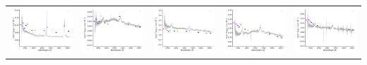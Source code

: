\begin{center}
\begin{longtable}{l l l l l }
    \includegraphics[width=0.2\linewidth, clip]{Figs/Figs-sdss/spec-9238-58013-0137-SPLUS-s02s09-056401.pdf} & \includegraphics[width=0.2\linewidth, clip]{Figs/Figs-sdss/spec-9239-58018-0729-STRIPE82-0136-042690.pdf} & \includegraphics[width=0.2\linewidth, clip]{Figs/Figs-sdss/spec-9383-58097-0530-STRIPE82-0047-031879.pdf} & \includegraphics[width=0.2\linewidth, clip]{Figs/Figs-sdss/spec-9403-58018-0690-STRIPE82-0002-034805.pdf} & \includegraphics[width=0.2\linewidth, clip]{Figs/Figs-sdss/spec-9405-58048-0414-STRIPE82-0009-022679.pdf} \\

\end{longtable}
\end{center}
